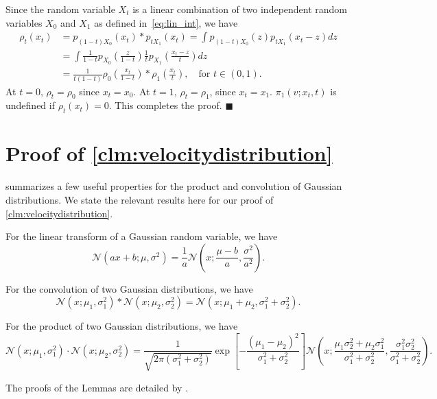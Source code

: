 Since the random variable $X_t$ is a linear combination of two independent random variables $X_0$ and $X_1$ as defined in~\cref{eq:lin_int}, we have 
\begin{align}
\label{eq:pxt}
 \rho_t (x_t) & = p_{(1-t)X_0} (x_t) * p_{tX_1} (x_t)   = \int p_{(1-t)X_0} (z) p_{tX_1} (x_t-z)  dz \nonumber \\
 & = \int \frac{1}{1-t} p_{X_0} \left( \frac{z}{1-t} \right) \frac{1}{t}p_{X_1} \left(\frac{x_t-z}{t} \right) d z \nonumber \\
 & = \frac{1}{t(1-t)} \rho_0 \left( \frac{x_t}{1-t} \right) * \rho_1 \left( \frac{x_t}{t}\right), \quad \text{for }t \in (0, 1).
\end{align}
At $t = 0$, $\rho_t = \rho_0$ since $x_t = x_0$. At $t = 1$, $\rho_t = \rho_1$, since $x_t = x_1$. $ \pi_1(v; x_t, t) $ is undefined if $\rho_t(x_t) = 0$.
This completes the proof.
\hfill$\blacksquare$


\section{Proof of \cref{clm:velocitydistribution}}
\label{sec:proof_claim_1}
\citet{bromiley2003products} summarizes a few useful properties for the product and convolution of Gaussian distributions. We state the relevant results here for our proof of \cref{clm:velocitydistribution}.  
\begin{lemma}
\label{lem:GLT}
For the linear transform of a Gaussian random variable, we have $$\mathcal{N}(ax + b; \mu, \sigma^2) = \frac{1}{a} \mathcal{N}\left(x; \frac{\mu - b}{a} , \frac{\sigma^2}{a^2} \right).$$
\end{lemma}

\begin{lemma}
\label{lem:Gconv}
 For the convolution of two Gaussian distributions, we have $$\mathcal{N}(x; \mu_1, \sigma_1^2) * \mathcal{N}(x; \mu_2, \sigma_2^2) = \mathcal{N}(x; \mu_1 + \mu_2, \sigma_1^2 + \sigma_2^2).$$
\end{lemma}

\begin{lemma}
\label{lem:Gprod}
 For the product of two Gaussian distributions, we have $$ \mathcal{N}(x; \mu_1, \sigma_1^2) \cdot \mathcal{N}(x; \mu_2, \sigma_2^2) = \frac{1}{\sqrt{2\pi(\sigma_1^2 + \sigma_2^2)}} \exp\left[- \frac{(\mu_1 - \mu_2)^2}{\sigma_1^2 + \sigma_2^2} \right] \mathcal{N}\left (x; \frac{\mu_1 \sigma_2^2 + \mu_2 \sigma_1^2}{\sigma_1^2 + \sigma_2^2} , \frac{\sigma_1^2 \sigma_2^2}{\sigma_1^2 + \sigma_2^2} \right). $$
\end{lemma}
The proofs of the Lemmas are detailed by \citet{bromiley2003products}.


